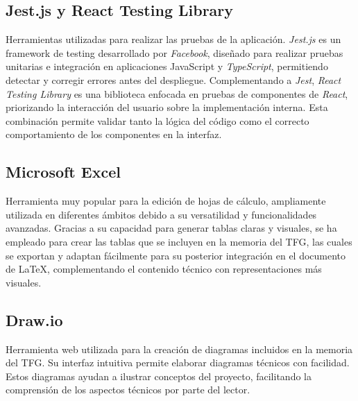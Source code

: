 \subsection{Jest.js y React Testing Library}
Herramientas utilizadas para realizar las pruebas de la aplicación. \textit{Jest.js} es un framework de testing desarrollado por \textit{Facebook}, diseñado para realizar pruebas unitarias e integración en aplicaciones JavaScript y \textit{TypeScript}, permitiendo detectar y corregir errores antes del despliegue. Complementando a \textit{Jest}, \textit{React Testing Library} es una biblioteca enfocada en pruebas de componentes de \textit{React}, priorizando la interacción del usuario sobre la implementación interna. Esta combinación permite validar tanto la lógica del código como el correcto comportamiento de los componentes en la interfaz.

\subsection{Microsoft Excel}
Herramienta muy popular para la edición de hojas de cálculo, ampliamente utilizada en diferentes ámbitos debido a su versatilidad y funcionalidades avanzadas. Gracias a su capacidad para generar tablas claras y visuales, se ha empleado para crear las tablas que se incluyen en la memoria del TFG, las cuales se exportan y adaptan fácilmente para su posterior integración en el documento de \LaTeX, complementando el contenido técnico con representaciones más visuales.

\subsection{Draw.io}
Herramienta web utilizada para la creación de diagramas incluidos en la memoria del TFG. Su interfaz intuitiva permite elaborar diagramas técnicos con facilidad. Estos diagramas ayudan a ilustrar conceptos del proyecto, facilitando la comprensión de los aspectos técnicos por parte del lector.

